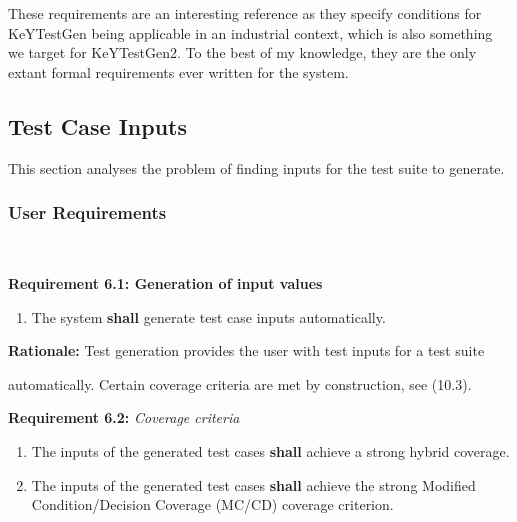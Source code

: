 \documentclass{article}
\newcommand{\tmem}[1]{{\em #1\/}}
\newcommand{\tmstrong}[1]{\textbf{#1}}
\newenvironment{enumeratealpha}{\begin{enumerate}[a{\textup{)}}] }{\end{enumerate}}
\begin{document}
These requirements are an interesting reference as they specify conditions
for KeYTestGen being applicable in an industrial context, which is also
something we target for KeYTestGen2. To the best of my knowledge, they are the
only extant formal requirements ever written for the system.

\subsection{Test Case Inputs}

This section analyses the problem of finding inputs for the test suite to
generate.



\subsubsection{User Requirements} \



{\tmstrong{Requirement 6.1: Generation of input values}}
\begin{enumeratealpha}
  \item The system {\tmstrong{shall}} generate test case inputs automatically.
  
\end{enumeratealpha}


{\tmstrong{Rationale:}} Test generation provides the user with test inputs for
a test suite

automatically. Certain coverage criteria are met by construction, see (10.3).



{\tmstrong{Requirement 6.2:}} {\tmem{Coverage criteria}}
\begin{enumeratealpha}
  \item The inputs of the generated test cases {\tmstrong{shall}} achieve a
  strong hybrid coverage.
  
  \item The inputs of the generated test cases {\tmstrong{shall}} achieve the
  strong Modified Condition/Decision Coverage (MC/CD) coverage criterion.
\end{enumeratealpha}
\end{document}

